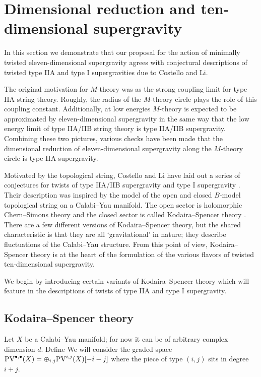 \def\im{{\rm i}}

\section{Dimensional reduction and ten-dimensional supergravity}
\label{sec:dimred}

In this section we demonstrate that our proposal for the action of minimally twisted eleven-dimensional supergravity agrees with conjectural descriptions of twisted type IIA and type I supergravities due to Costello and Li. 

The original motivation for $M$-theory was as the strong coupling limit for type IIA string theory.
Roughly, the radius of the $M$-theory circle plays the role of this coupling constant. 
Additionally, at low energies $M$-theory is expected to be approximated by eleven-dimensional supergravity in the same way that the low energy limit of type IIA/IIB string theory is type IIA/IIB supergravity. 
Combining these two pictures, various checks have been made that the dimensional reduction of eleven-dimensional supergravity along the $M$-theory circle is type IIA supergravity. 

Motivated by the topological string, Costello and Li have laid out a series of conjectures for twists of type IIA/IIB supergravity \cite{CLsugra} and type I supergravity \cite{CLtypeI}. 
Their description was inspired by the model of the open and closed $B$-model topological string on a Calabi--Yau manifold. 
The open sector is holomorphic Chern--Simons theory \cite{WittenOpen} and the closed sector is called Kodaira--Spencer theory \cite{BCOV}. 
There are a few different versions of Kodaira--Spencer theory, but the shared characteristic is that they are all `gravitational' in nature; they describe fluctuations of the Calabi--Yau structure. 
From this point of view, Kodaira--Spencer theory is at the heart of the formulation of the various flavors of twisted ten-dimensional supergravity.

We begin by introducing certain variants of Kodaira--Spencer theory which will feature in the descriptions of twists of type IIA and type I supergravity.

\subsection{Kodaira--Spencer theory}
\label{s:BCOV}

Let $X$ be a Calabi--Yau manifold; for now it can be of arbitrary complex dimension $d$. 
Define
We will consider the graded space ${\rm PV}^{\bullet,\bullet}(X) = \oplus_{i,j} {\rm PV}^{i,j}(X)[-i-j]$ where the piece of type $(i,j)$ sits in degree $i+j$. 

